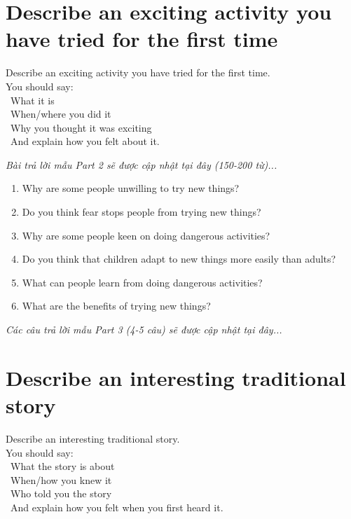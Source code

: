 \section{Describe an exciting activity you have tried for the first time}
\begin{ieltsprompt}
Describe an exciting activity you have tried for the first time. \\
You should say: \\
\textbullet\ What it is \\
\textbullet\ When/where you did it \\
\textbullet\ Why you thought it was exciting \\
\textbullet\ And explain how you felt about it. \\
\end{ieltsprompt}

\vspace{1em}
\textit{Bài trả lời mẫu Part 2 sẽ được cập nhật tại đây (150-200 từ)...}
\vspace{2em}

\begin{ieltsprompt}
\begin{enumerate}[itemsep=4pt]
    \item Why are some people unwilling to try new things?
    \item Do you think fear stops people from trying new things?
    \item Why are some people keen on doing dangerous activities?
    \item Do you think that children adapt to new things more easily than adults?
    \item What can people learn from doing dangerous activities?
    \item What are the benefits of trying new things?
\end{enumerate}
\end{ieltsprompt}

\vspace{1em}
\textit{Các câu trả lời mẫu Part 3 (4-5 câu) sẽ được cập nhật tại đây...}
\vspace{2em}

\section{Describe an interesting traditional story}
\begin{ieltsprompt}
Describe an interesting traditional story. \\
You should say: \\
\textbullet\ What the story is about \\
\textbullet\ When/how you knew it \\
\textbullet\ Who told you the story \\
\textbullet\ And explain how you felt when you first heard it. \\
\end{ieltsprompt}

